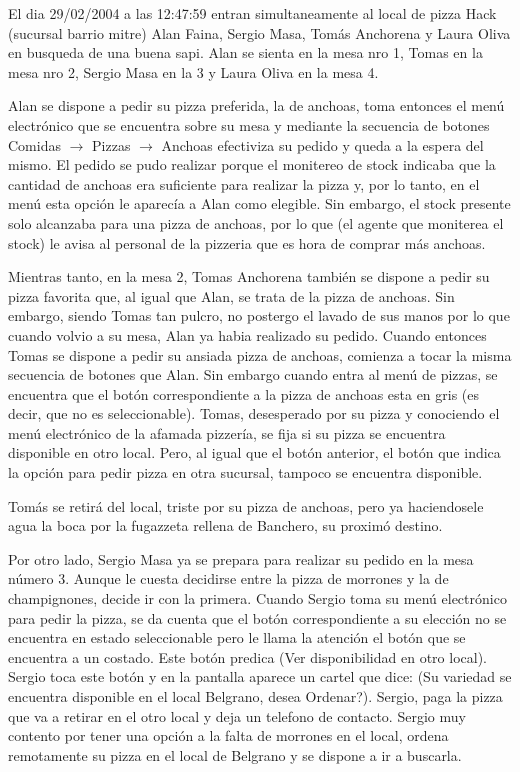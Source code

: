 \documentclass[a4paper,10pt]{article}
\begin{document}
El dia 29/02/2004 a las 12:47:59 entran simultaneamente al local de pizza Hack (sucursal barrio mitre) Alan Faina, 
Sergio Masa, Tom\'as Anchorena y Laura Oliva en busqueda de una buena sapi. 
Alan se sienta en la mesa nro 1, Tomas en la mesa nro 2, Sergio Masa en la 3 y Laura Oliva en la mesa 4. 

Alan se dispone a pedir su pizza preferida, la de anchoas, toma entonces el men\'u electr\'onico que se encuentra sobre su mesa y
mediante la secuencia de botones Comidas $\rightarrow$ Pizzas $\rightarrow$ Anchoas efectiviza su pedido y queda a la espera del mismo. El pedido se pudo 
realizar porque el monitereo de stock indicaba que la cantidad de anchoas era suficiente para realizar la pizza y, por lo tanto, en el men\'u
esta opci\'on le aparec\'ia a Alan como elegible. Sin embargo, el stock presente solo alcanzaba para una pizza de anchoas, por lo que (el agente
que moniterea el stock) le avisa al personal de la pizzeria que es hora de comprar m\'as anchoas.

Mientras tanto, en la mesa 2, Tomas Anchorena tambi\'en se dispone a pedir su pizza favorita que, al igual que Alan, se trata de la pizza de 
anchoas. Sin embargo, siendo Tomas tan pulcro, no postergo el lavado de sus manos por lo que cuando volvio a su mesa, Alan ya habia realizado
su pedido. Cuando entonces Tomas se dispone a pedir su ansiada pizza de anchoas, comienza a tocar la misma secuencia de botones que Alan. Sin embargo
cuando entra al men\'u de pizzas, se encuentra que el bot\'on correspondiente a la pizza de anchoas esta en gris (es decir, que no es seleccionable).
Tomas, desesperado por su pizza y conociendo el men\'u electr\'onico de la afamada pizzer\'ia, se fija si su pizza se encuentra disponible en otro
local. Pero, al igual que el bot\'on anterior, el bot\'on que indica la opci\'on para pedir pizza en otra sucursal, tampoco se encuentra disponible.

Tom\'as se retir\'a del local, triste por su pizza de anchoas, pero ya haciendosele agua la boca por la fugazzeta rellena de Banchero, su proxim\'o destino.

Por otro lado, Sergio Masa ya se prepara para realizar su pedido en la mesa n\'umero 3. Aunque le cuesta decidirse entre la pizza de morrones
y la de champignones, decide ir con la primera. Cuando Sergio toma su men\'u electr\'onico para pedir la pizza, se da cuenta que el bot\'on 
correspondiente a su elecci\'on no se encuentra en estado seleccionable pero le llama la atenci\'on el bot\'on que se encuentra a un costado. Este
bot\'on predica (Ver disponibilidad en otro local). Sergio toca este bot\'on y en la pantalla aparece un cartel que dice: (Su variedad se encuentra
disponible en el local Belgrano, desea Ordenar?). Sergio, paga la pizza que va a retirar en el otro local y deja un telefono de contacto. Sergio muy contento por tener una opci\'on a la falta de morrones en el local, ordena remotamente su pizza
en el local de Belgrano y se dispone a ir a buscarla. 
\end{document}
